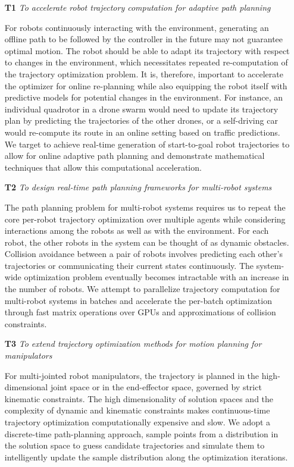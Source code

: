 \begin{enumerate}\label{enum:problems-addressed-by-thesis}
    \item[\textbf{T1}] \textit{To accelerate robot trajectory computation for adaptive path planning}

    For robots continuously interacting with the environment, generating an offline path to be followed by the controller in the future may not guarantee optimal motion. The robot should be able to adapt its trajectory with respect to changes in the environment, which necessitates repeated re-computation of the trajectory optimization problem. It is, therefore, important to accelerate the optimizer for online re-planning while also equipping the robot itself with predictive models for potential changes in the environment. For instance, an individual quadrotor in a drone swarm would need to update its trajectory plan by predicting the trajectories of the other drones, or a self-driving car would re-compute its route in an online setting based on traffic predictions. We target to achieve real-time generation of start-to-goal robot trajectories to allow for online adaptive path planning and demonstrate mathematical techniques that allow this computational acceleration.
    

    \item[\textbf{T2}] \textit{To design real-time path planning frameworks for multi-robot systems}\label{intro:multi-robot_aim}

    The path planning problem for multi-robot systems requires us to repeat the core per-robot trajectory optimization over multiple agents while considering interactions among the robots as well as with the environment. For each robot, the other robots in the system can be thought of as dynamic obstacles. Collision avoidance between a pair of robots involves predicting each other's trajectories or communicating their current states continuously. The system-wide optimization problem eventually becomes intractable with an increase in the number of robots. We attempt to parallelize trajectory computation for multi-robot systems in batches and accelerate the per-batch optimization through fast matrix operations over GPUs and approximations of collision constraints.

    \item[\textbf{T3}] \textit{To extend trajectory optimization methods for motion planning for manipulators}

    For multi-jointed robot manipulators, the trajectory is planned in the high-dimensional joint space or in the end-effector space, governed by strict kinematic constraints. The high dimensionality of solution spaces and the complexity of dynamic and kinematic constraints makes continuous-time trajectory optimization computationally expensive and slow. We adopt a discrete-time path-planning approach, sample points from a distribution in the solution space to guess candidate trajectories and simulate them to intelligently update the sample distribution along the optimization iterations. 
    
\end{enumerate}

